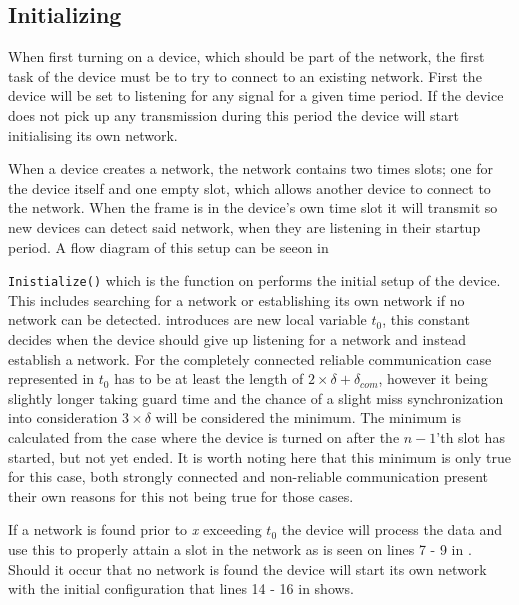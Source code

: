 \subsection{Initializing} %
\label{sub:setup} 
When first turning on a device, which should be part of the network, the first task of the device must be to try to connect to an existing network.
First the device will be set to listening for any signal for a given time period. 
If the device does not pick up any transmission during this period the device will start initialising its own network.

When a device creates a network, the network contains two times slots; one for the device itself and one empty slot, which allows another device to connect to the network.
When the frame is in the device's own time slot it will transmit so new devices can detect said network, when they are listening in their startup period.  
A flow diagram of this setup can be seeon in 

 
\bigskip \noindent
\texttt{Inistialize()} which is the function on performs the initial setup of the device.
This includes searching for a network or establishing its own network if no network can be detected.
 introduces are new local variable $t_0$, this constant decides when the device should give up listening for a network and instead establish a network.
For the completely connected reliable communication case represented in  $t_0$ has to be at least the length of $2 \times \delta + \delta_{com}$, however it being slightly longer taking guard time and the chance of a slight miss synchronization into consideration $3 \times \delta$ will be considered the minimum.
The minimum is calculated from the case where the device is turned on after the $n-1$'th slot has started, but not yet ended.
It is worth noting here that this minimum is only true for this case, both strongly connected and non-reliable communication present their own reasons for this not being true for those cases.

If a network is found prior to \textit{x} exceeding $t_0$ the device will process the data and use this to properly attain a slot in the network as is seen on lines 7 - 9 in .
Should it occur that no network is found the device will start its own network with the initial configuration that lines 14 - 16 in  shows.

